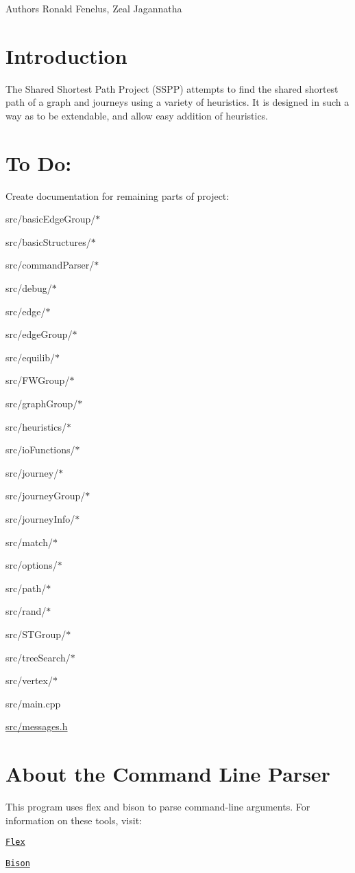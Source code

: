 \begin{DoxyAuthor}{Authors}
Ronald Fenelus, Zeal Jagannatha
\end{DoxyAuthor}
\hypertarget{index_intro}{}\section{Introduction}\label{index_intro}
The Shared Shortest Path Project (SSPP) attempts to find the shared shortest path of a graph and journeys using a variety of heuristics. It is designed in such a way as to be extendable, and allow easy addition of heuristics.\hypertarget{index_todo}{}\section{To Do:}\label{index_todo}
Create documentation for remaining parts of project:
\begin{DoxyItemize}
\item src/basicEdgeGroup/$\ast$
\item src/basicStructures/$\ast$
\item src/commandParser/$\ast$
\item src/debug/$\ast$
\item src/edge/$\ast$
\item src/edgeGroup/$\ast$
\item src/equilib/$\ast$
\item src/FWGroup/$\ast$
\item src/graphGroup/$\ast$
\item src/heuristics/$\ast$
\item src/ioFunctions/$\ast$
\item src/journey/$\ast$
\item src/journeyGroup/$\ast$
\item src/journeyInfo/$\ast$
\item src/match/$\ast$
\item src/options/$\ast$
\item src/path/$\ast$
\item src/rand/$\ast$
\item src/STGroup/$\ast$
\item src/treeSearch/$\ast$
\item src/vertex/$\ast$
\item src/main.cpp
\item \hyperlink{messages_8h}{src/messages.h}
\end{DoxyItemize}\hypertarget{index_parser}{}\section{About the Command Line Parser}\label{index_parser}
This program uses flex and bison to parse command-\/line arguments. For information on these tools, visit:

\href{http://www.gnu.org/software/flex/}{\tt Flex}

\href{http://www.gnu.org/software/bison/}{\tt Bison} 